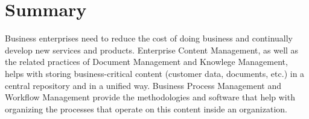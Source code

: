 \clearpage
\section{Summary}

Business enterprises need to reduce the cost of doing business and continually
develop new services and products. Enterprise Content Management, as well as
the related practices of Document Management and Knowlege Management, helps
with storing business-critical content (customer data, documents, etc.) in a
central repository and in a unified way. Business Process Management and
Workflow Management provide the methodologies and software that help with
organizing the processes that operate on this content inside an organization.

